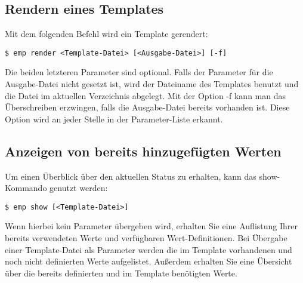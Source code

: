 \subsection{Rendern eines Templates}
Mit dem folgenden Befehl wird ein Template gerendert:
\begin{lstlisting}[style=Bash]
$ emp render <Template-Datei> [<Ausgabe-Datei>] [-f]
\end{lstlisting}

Die beiden letzteren Parameter sind optional. Falls der Parameter für die Ausgabe-Datei nicht gesetzt ist, wird der Dateiname des Templates benutzt und die Datei im aktuellen Verzeichnis abgelegt. Mit der Option -f kann man das Überschreiben erzwingen, falls die Ausgabe-Datei bereits vorhanden ist. Diese Option wird an jeder Stelle in der Parameter-Liste erkannt.

\subsection{Anzeigen von bereits hinzugefügten Werten}
Um einen Überblick über den aktuellen Status zu erhalten, kann das show-Kommando genutzt werden:
\begin{lstlisting}[style=Bash]
$ emp show [<Template-Datei>]
\end{lstlisting}
Wenn hierbei kein Parameter übergeben wird, erhalten Sie eine Auflistung Ihrer bereits verwendeten Werte und verfügbaren Wert-Definitionen.
Bei Übergabe einer Template-Datei als Parameter werden die im Template vorhandenen und noch nicht definierten Werte aufgelistet. Außerdem erhalten Sie eine Übersicht über die bereits definierten und im Template benötigten Werte.
